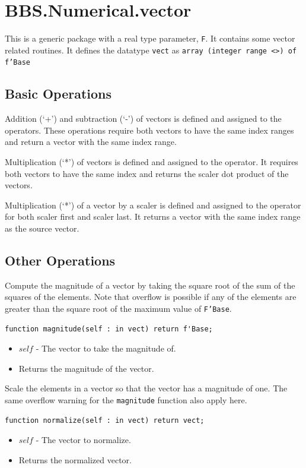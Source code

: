 \documentclass[10pt, openany]{book}
\newcommand{\indexfunc}[1]{\index[func]{#1}}
\newcommand{\function}[1]{\texttt{#1}}
\newcommand{\datatype}[1]{\texttt{#1}}
\begin{document}
\section{BBS.Numerical.vector}
This is a generic package with a real type parameter, \datatype{F}.  It contains some vector related routines.  It defines the datatype \datatype{vect} as \datatype{array (integer range <>) of f'Base}

\subsection{Basic Operations}
Addition (`+') and subtraction (`-') of vectors is defined and assigned to the operators.  These operations require both vectors to have the same index ranges and return a vector with the same index range.

Multiplication (`*') of vectors is defined and assigned to the operator.  It requires both vectors to have the same index and returns the scaler dot product of the vectors.

Multiplication (`*') of a vector by a scaler is defined and assigned to the operator for both scaler first and scaler last.  It returns a vector with the same index range as the source vector.

\subsection{Other Operations}

Compute the magnitude of a vector by taking the square root of the sum of the squares of the elements.  Note that overflow is possible if any of the elements are greater than the square root of the maximum value of \datatype{F'Base}.
\begin{lstlisting}
function magnitude(self : in vect) return f'Base;
\end{lstlisting}
\indexfunc{vect-magnitude}
\begin{itemize}
  \item $self$ - The vector to take the magnitude of.
  \item Returns the magnitude of the vector.
\end{itemize}

Scale the elements in a vector so that the vector has a magnitude of one.  The same overflow warning for the \function{magnitude} function also apply here.
\begin{lstlisting}
function normalize(self : in vect) return vect;
\end{lstlisting}
\indexfunc{vect-normalize}
\begin{itemize}
  \item $self$ - The vector to normalize.
  \item Returns the normalized vector.
\end{itemize}

\clearpage
%
%
\printindex[func]
%
%
\nocite{NA3rd}


\end{document}
